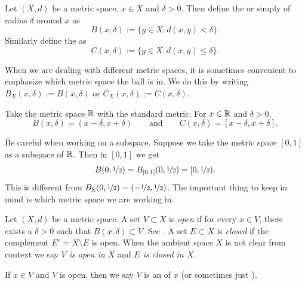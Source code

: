 \begin{defn}
Let $(X,d)$ be a metric space, $x \in X$ and $\delta > 0$.  Then define
the \emph{} or simply \emph{} of radius $\delta$
around $x$ as
\begin{equation*}
B(x,\delta) := \{ y \in X : d(x,y) < \delta \} .
\end{equation*}
Similarly define the \emph{} as
\begin{equation*}
C(x,\delta) := \{ y \in X : d(x,y) \leq \delta \} .
\end{equation*}
\end{defn}

When we are dealing with different metric spaces, it is sometimes 
convenient to emphasize which metric space the ball is in.  We do this by
writing $B_X(x,\delta) := B(x,\delta)$ or $C_X(x,\delta) := C(x,\delta)$.

\begin{example}
Take the metric space ${\mathbb{R}}$ with the standard metric.  For
$x \in {\mathbb{R}}$ and $\delta > 0$,
\begin{equation*}
B(x,\delta) = (x-\delta,x+\delta) \qquad \text{and} \qquad
C(x,\delta) = [x-\delta,x+\delta] .
\end{equation*}
\end{example}

\begin{example}
Be careful when working on a subspace.  Suppose we take the
metric space $[0,1]$ as a subspace of ${\mathbb{R}}$.  Then in $[0,1]$
we get
\begin{equation*}
B(0,\nicefrac{1}{2}) = B_{[0,1]}(0,\nicefrac{1}{2}) = [0,\nicefrac{1}{2}) .
\end{equation*}
This is different from $B_{{\mathbb{R}}}(0,\nicefrac{1}{2}) =
(-\nicefrac{1}{2},\nicefrac{1}{2})$.
The important thing to keep in mind is which metric space we are working
in.
\end{example}

\begin{defn}
Let $(X,d)$ be a metric space.  A set $V \subset X$
is \emph{open}
if for every $x \in V$, there exists a $\delta > 0$ such that
$B(x,\delta) \subset V$.  See .  A set $E \subset X$ is 
\emph{closed} if the complement $E^c = X \setminus E$ is open.
When the ambient space $X$ is not clear from context we say
\emph{$V$ is open in $X$} and \emph{$E$ is closed in $X$}.

If $x \in V$ and $V$ is open, then we say 
$V$ is an \emph{} of $x$ (or
sometimes just \emph{}).
\end{defn}

